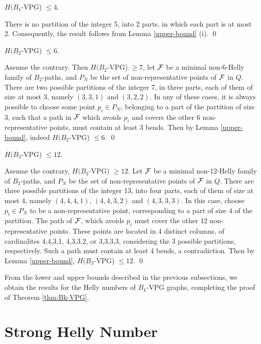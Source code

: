 \begin{lema}\label{claim:upper-B1-VPG}
$H(B_1$-VPG) $\leq  4$.
\end{lema}

\proof There is no partition of the integer 5, into 2 parts, in which each part is at most 2. Consequently, the result follows from Lemma \ref{upper-bound} (i). \qed

\begin{lema}\label{claim:upper-B2-VPG}
$H(B_2$-VPG)  $\leq  6$.
\end{lema}

\proof Assume the contrary. Then $H(B_2$-VPG) $\geq  7$, let $\cal F$ be a minimal non-6-Helly family of $B_2$-paths, and  $P_N$ be the set of non-representative points of $\cal F$ in $Q$. There are two possible partitions of the integer 7, in three parts, each of them of size at most 3, namely $(3,3,1)$ and $(3,2,2)$. In any of these cases,  it is always possible to choose some point  $p_i \in P_N$, belonging  to a part of the partition of size 3, such that a path in $\cal F$  which  avoids $p_i$ and covers the other 6 non-representative points, must contain at least 3 bends.  Then by Lemma \ref{upper-bound}, indeed $H(B_2$-VPG)  $\leq  6$. \qed


\begin{lema}\label{claim:upper-B3-VPG}
$H(B_3$-VPG) $\leq  12$.
\end{lema}

\proof Assume the contrary, $H(B_3$-VPG) $\geq  12$. Let $\cal F$ be a minimal non-12-Helly family of $B_3$-paths, and  $P_N$ be the set of non-representative points of $\cal F$ in $Q$. There are three possible partitions of the integer 13, into four parts, each of them of size at most 4, namely $(4,4,4,1)$, $(4,4,3,2)$ and $(4,3,3,3)$. In this case, choose $p_i \in P_N$ to be a non-representative point, corresponding to a part of size $4$ of the partition.  The path of ${\cal F}$, which avoids $p_i$ must cover the other 12 non-representative points. These points are located in 4 distinct columns, of cardinalites 4,4,3,1, 4,3,3,2, or 3,3,3,3, considering the 3 possible partitions, respectively. Such a path must contain at least 4 bends, a contradiction. Then by Lemma \ref{upper-bound}, $H(B_3$-VPG) $\leq  12$.    \qed  

From the lower and upper bounds described in the previous subsections, we obtain the results for the Helly numbers of $B_k$-VPG graphs, completing the proof of Theorem \ref{thm:Bk-VPG}.

\section{Strong Helly Number} 

